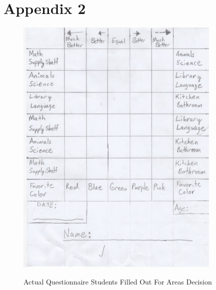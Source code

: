 \documentclass[11pt]{article}
\begin{document}
\section{Appendix 2}
\begin{figure}[!hb]
\caption{Actual Questionnaire Students Filled Out For Areas Decision}
\includegraphics[height=5in]{SampleAHPQuestionnaire}
\label{fig:2}
\end{figure}
\end{document}
